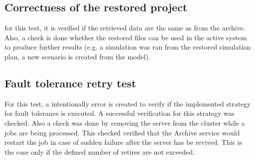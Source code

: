 \subsection{Correctness of the restored project}
for this test, it is verified if the retrieved data are the same as from the archive. Also, a check is done whether the restored files can be used in the active system
to produce further results (e.g. a simulation was ran from the restored simulation plan, a new scenario is created from the model).

\subsection{Fault tolerance retry test}
For this test, a intentionally error is created to verify if the implemented strategy for fault tolerance is executed. A successful verification for this
strategy was checked. Also a check was done by removing the server from the cluster while a jobs are being processed. This checked verified that the Archive service
would restart the job in case of sudden failure after the server has be revived. This is the case only if the defined number of retires are not exceeded.